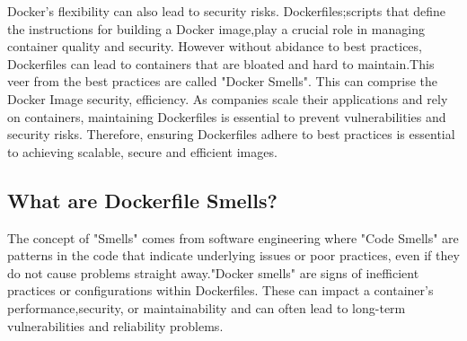 Docker's flexibility can also lead to security risks. Dockerfiles;scripts that define the instructions for building a Docker image\cite{hardikar2021containerization},play a crucial role in managing container quality and security. However without abidance to best practices, Dockerfiles can lead to containers that are bloated and hard to maintain.This veer from the best practices are called "Docker Smells". This can comprise the Docker Image security, efficiency. As companies scale their applications and rely on containers, maintaining Dockerfiles is essential to prevent vulnerabilities and security risks. Therefore, ensuring Dockerfiles adhere to best practices is essential to achieving scalable, secure and efficient images. 

\subsection{What are Dockerfile Smells?}
The concept of "Smells" comes from  software engineering where "Code Smells" are patterns in the code that indicate underlying issues or poor practices, even if they do not cause problems straight away."Docker smells" are signs of inefficient practices or configurations within Dockerfiles. These can impact a container's performance,security, or maintainability and can often lead to long-term vulnerabilities and reliability problems. 


